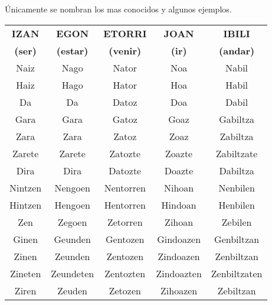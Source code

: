 \documentclass[11pt, a4paper]{article}
\begin{document}
Únicamente se nombran los mas conocidos y algunos ejemplos.
\newpage

\begin{table}[h]
	\centering
	\begin{tabular}{|c|c|c|c|c|}
		\hline
		\textbf{ IZAN }  &  \textbf{ EGON }  &  \textbf{ETORRI}  & \textbf{JOAN}  &  \textbf{IBILI}   \\
		\textbf{ (ser) } & \textbf{(estar) } & \textbf{(venir) } & \textbf{(ir) } & \textbf{(andar) } \\ \hline\hline
		      Naiz       &       Nago        &       Nator       &      Noa       &       Nabil       \\ \hline
		      Haiz       &       Hago        &       Hator       &      Hoa       &       Habil       \\ \hline
		       Da        &        Da         &       Datoz       &      Doa       &       Dabil       \\ \hline
		      Gara       &       Gara        &       Gatoz       &      Goaz      &     Gabiltza      \\ \hline
		      Zara       &       Zara        &       Zatoz       &      Zoaz      &     Zabiltza      \\ \hline
		     Zarete      &      Zarete       &      Zatozte      &     Zoazte     &    Zabiltzate     \\ \hline
		      Dira       &       Dira        &      Datozte      &     Doazte     &     Dabiltza      \\ \hline\hline
		    Nintzen      &      Nengoen      &     Nentorren     &     Nihoan     &     Nenbilen      \\ \hline
		    Hintzen      &      Hengoen      &     Hentorren     &    Hindoan     &     Henbilen      \\ \hline
		      Zen        &      Zegoen       &     Zetorren      &     Zihoan     &      Zebilen      \\ \hline
		     Ginen       &      Geunden      &     Gentozen      &   Gindoazen    &    Genbiltzan     \\ \hline
		     Zinen       &      Zeunden      &     Zentozen      &   Zindoazen    &    Zenbiltzan     \\ \hline
		    Zineten      &     Zeundeten     &     Zentozten     &   Zindoazten   &   Zenbiltzaten    \\ \hline
		     Ziren       &      Zeuden       &      Zetozen      &    Zihoazen    &     Zebiltzan     \\ \hline
	\end{tabular}
\end{table}
\end{document}
